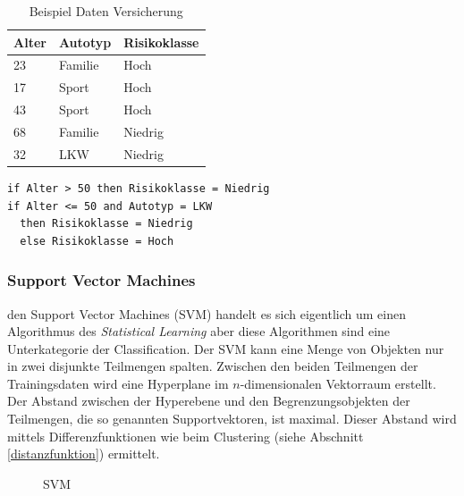 \documentclass[12pt,journal,compsoc]{IEEEtran}
\begin{document}
\begin{table}[!h]
\caption{Beispiel Daten Versicherung}
\centering
\begin{tabular}{l|l|l}\hline
Alter	& Autotyp	& Risikoklasse \\\hline
23	& Familie	& Hoch\\
17	& Sport		& Hoch\\
43	& Sport		& Hoch\\
68	& Familie	& Niedrig\\
32	& LKW		& Niedrig
\end{tabular}
\label{trainingdata}
\end{table}
\begin{lstlisting}[caption={Entscheidungsbaum},label=dt,frame=single]
if Alter > 50 then Risikoklasse = Niedrig
if Alter <= 50 and Autotyp = LKW 
  then Risikoklasse = Niedrig
  else Risikoklasse = Hoch
\end{lstlisting}

\subsubsection{Support Vector Machines}
 den Support Vector Machines (SVM) handelt es sich eigentlich 
um einen Algorithmus des \emph{Statistical Learning} aber diese Algorithmen sind eine
Unterkategorie der Classification. Der SVM kann eine Menge von Objekten nur in zwei 
disjunkte Teilmengen spalten. Zwischen den beiden Teilmengen der Trainingsdaten wird 
eine Hyperplane im $n$-dimensionalen Vektorraum erstellt. Der Abstand zwischen der
Hyperebene und den Begrenzungsobjekten der Teilmengen, die so genannten Supportvektoren, 
ist maximal. Dieser Abstand wird mittels Differenzfunktionen wie beim Clustering 
(siehe Abschnitt \ref{distanzfunktion}) ermittelt.

\begin{figure}[!t]
\centering
\subfigure[Gesucht]{\scalebox{0.42}{}\label{hyperplane gesucht}}
\subfigure[Gefunden]{\scalebox{0.42}{}\label{hyperplane gefunden}}
\subfigure[Einordnung]{\scalebox{0.49}{}\label{einordnung}}
\caption{SVM}
\label{svm_pic}
\end{figure}
\end{document}
